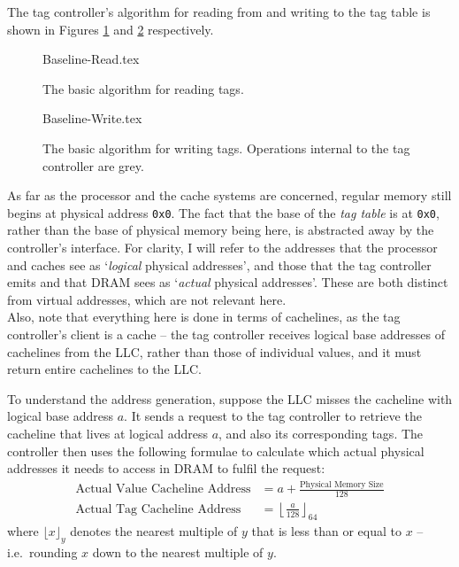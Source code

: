 
The tag controller's algorithm for reading from and writing to the tag table is shown in Figures \ref{fig:bar} and \ref{fig:baw} respectively.
\begin{figure}[H]
	\centering
	{Baseline-Read.tex}
	\caption{The basic algorithm for reading tags.}
	\label{fig:bar}
\end{figure}

\begin{figure}[H]
	\centering
	{Baseline-Write.tex}
	\caption{The basic algorithm for writing tags. Operations internal to the tag controller are grey.}
	\label{fig:baw}
\end{figure}

As far as the processor and the cache systems are concerned, regular memory still begins at physical address \texttt{0x0}. The fact that the base of the \textit{tag table} is at \texttt{0x0}, rather than the base of physical memory being here, is abstracted away by the controller's interface. For clarity, I will refer to the addresses that the processor and caches see as `\textit{logical} physical addresses', and those that the tag controller emits and that DRAM sees as `\textit{actual} physical addresses'. These are both distinct from virtual addresses, which are not relevant here.\\
Also, note that everything here is done in terms of cachelines, as the tag controller's client is a cache -- the tag controller receives logical base addresses of cachelines from the LLC, rather than those of individual values, and it must return entire cachelines to the LLC.

To understand the address generation, suppose the LLC misses the cacheline with logical base address $a$. It sends a request to the tag controller to retrieve the cacheline that lives at logical address $a$, and also its corresponding tags. The controller then uses the following formulae to calculate which actual physical addresses it needs to access in DRAM to fulfil the request:
\begin{align}
	\label{eq:avcas} \text{Actual Value Cacheline Address} &= a + \frac{\text{Physical Memory Size}}{128}\\
	\label{eq:atcas} \text{Actual Tag Cacheline Address} &= \left\lfloor \frac{a}{128} \right\rfloor_{64}
\end{align}
where $\lfloor x \rfloor_y$ denotes the nearest multiple of $y$ that is less than or equal to $x$ -- i.e.\ rounding $x$ down to the nearest multiple of $y$.

